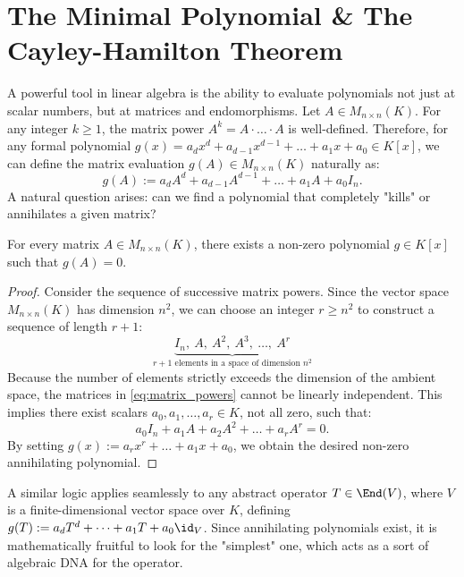 \section{The Minimal Polynomial \& The Cayley-Hamilton Theorem}

A powerful tool in linear algebra is the ability to evaluate polynomials not just at scalar numbers, but at matrices and endomorphisms. Let $A \in M_{n \times n}(K)$. For any integer $k \ge 1$, the matrix power $A^k = A \cdot \dots \cdot A$ is well-defined. Therefore, for any formal polynomial $g(x) = a_d x^d + a_{d-1}x^{d-1} + \dots + a_1 x + a_0 \in K[x]$, we can define the matrix evaluation $g(A) \in M_{n \times n}(K)$ naturally as:
\[
g(A) := a_d A^d + a_{d-1}A^{d-1} + \dots + a_1 A + a_0 I_n.
\]
A natural question arises: can we find a polynomial that completely "kills" or annihilates a given matrix?

\begin{claim*}\label{claim:existence_annihilating}
  For every matrix $A \in M_{n \times n}(K)$, there exists a non-zero polynomial $g \in K[x]$ such that $g(A) = 0$.
\end{claim*}

\begin{proof}
  Consider the sequence of successive matrix powers. Since the vector space $M_{n \times n}(K)$ has dimension $n^2$, we can choose an integer $r \ge n^2$ to construct a sequence of length $r+1$:
  \begin{equation} \label{eq:matrix_powers}
    \underbrace{I_n, \ A, \ A^2, \ A^3, \ \dots, \ A^r}_{r+1 \text{ elements in a space of dimension } n^2}
  \end{equation}
  Because the number of elements strictly exceeds the dimension of the ambient space, the matrices in \eqref{eq:matrix_powers} cannot be linearly independent. This implies there exist scalars $a_0, a_1, \dots, a_r \in K$, not all zero, such that:
  \[
  a_0 I_n + a_1 A + a_2 A^2 + \dots + a_r A^r = 0.
  \]
  By setting $g(x) := a_r x^r + \dots + a_1 x + a_0$, we obtain the desired non-zero annihilating polynomial.
\end{proof}

A similar logic applies seamlessly to any abstract operator $T \in \End(V)$, where $V$ is a finite-dimensional vector space over $K$, defining $g(T) := a_d T^d + \dots + a_1 T + a_0 \id_V$. Since annihilating polynomials exist, it is mathematically fruitful to look for the "simplest" one, which acts as a sort of algebraic DNA for the operator.

